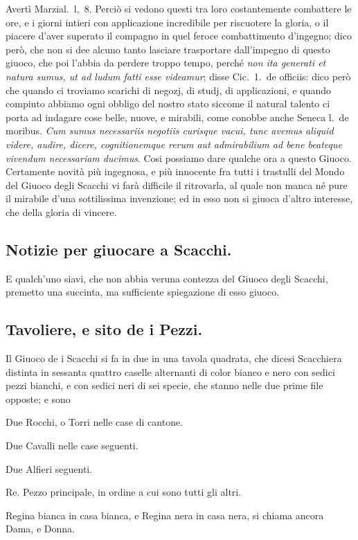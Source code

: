 \documentclass[11pt,a6paper]{article}
\begin{document}
Avertì Marzial.\ l,\ 8. Perciò si vedono questi
tra loro costantemente combattere le ore, e
i giorni intieri con applicazione incredibile
per riscuotere la gloria, o il piacere d'aver
superato il compagno in quel feroce combattimento
d'ingegno; dico però, che non si
dee alcuno tanto lasciare trasportare dall'impegno
di questo giuoco, che poi l'abbia da
perdere troppo tempo, perché \textit{non ita generati
et natura sumus, ut ad ludum fatti esse
videamur}; disse Cic.\ 1.\ de officiis: dico però
che quando ci troviamo scarichi di negozj, di
studj, di applicazioni, e quando compiuto abbiamo
ogni obbligo del nostro stato siccome il
natural talento ci porta ad indagare cose
belle, nuove, e mirabili, come conobbe anche
Seneca l.\ de moribus. \textit{Cum sumus necessariis
negotiis curisque vacui, tunc avemus aliquid
videre, audire, dicere, cognitionemque
rerum aut admirabilium ad bene beateque vivendum
necessariam ducimus}. Cosi possiamo
dare qualche ora a questo Giuoco. Certamente
novità più ingegnosa, e più innocente
fra tutti i trastulli del Mondo del Giuoco degli
Scacchi vi farà difficile il ritrovarla, al quale
non manca né pure il mirabile d'una sottilissima
invenzione; ed in esso non si giuoca d'altro
interesse, che della gloria di vincere.

\subsection{Notizie per giuocare a Scacchi.}

E qualch'uno siavi, che non abbia veruna
contezza del Giuoco degli Scacchi,
premetto una succinta, ma sufficiente
spiegazione di esso giuoco.

\subsection{Tavoliere, e sito de i Pezzi.}

Il Giuoco de i Scacchi si fa in due in una
tavola quadrata, che dicesi Scacchiera distinta
in sessanta quattro caselle alternanti di
color bianco e nero con sedici pezzi bianchi,
e con sedici neri di sei specie, che stanno nelle
due prime file opposte; e sono

Due Rocchi, o Torri nelle case di cantone.

Due Cavalli nelle case seguenti.

Due Alfieri seguenti.

Re. Pezzo principale, in ordine a cui sono tutti gli altri.

Regina bianca in casa bianca, e Regina
nera in casa nera, si chiama ancora Dama, e
Donna.
\end{document}

